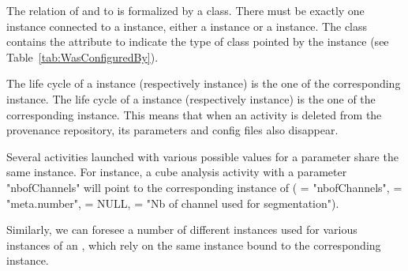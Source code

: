 The relation of  and  to  is formalized by a  class. There must be exactly one instance connected to a  instance, either a  instance or a  instance. The  class contains the attribute  to indicate the type of class pointed by the  instance (see Table~\ref{tab:WasConfiguredBy}).

The life cycle of a  instance (respectively  instance) is the one of the corresponding  instance.
The life cycle of a  instance (respectively  instance) is the one of the corresponding  instance.
This means that when an activity is deleted from the provenance repository, its parameters and config files also disappear.

Several activities launched with various possible values for a parameter share the same  instance.
For instance, a cube analysis activity with a parameter "nbofChannels" will point to the corresponding instance of  ( = "nbofChannels",  = "meta.number",  = NULL,  = "Nb of channel used for segmentation").

Similarly, we can foresee a number of different  instances used for various instances of an , which rely on the same  instance bound to the corresponding  instance.
